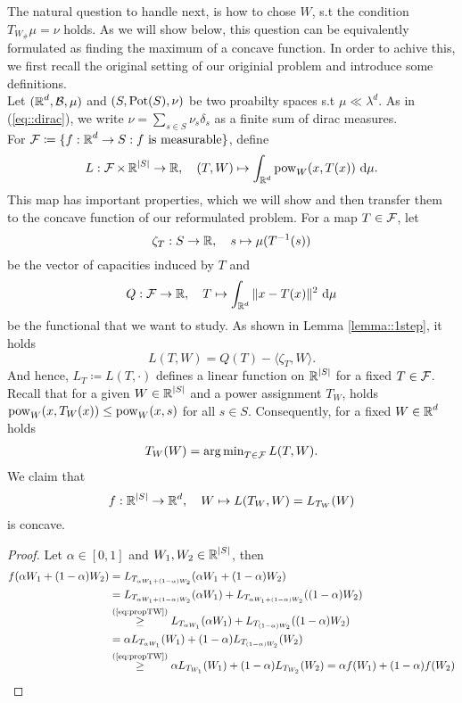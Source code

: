 \documentclass[
     12pt,         %
     a4paper,      %
     BCOR=10mm,     %
     DIV=14,        %
     ]{scrreprt}
\begin{document}
    The natural question to handle next, is how to chose $W$, s.t the condition $T_{W_{\#}}\mu = \nu$ holds. As we will show below, this question can be equivalently formulated
    as finding the maximum of a concave function. In order to achive this, we first recall the original setting of our originial problem and introduce some definitions. \\[8pt]
    \indent Let $(\operatorname{\mathbb{R}}^d, \operatorname{\mathcal{B}}, \mu)$ and $(S, \operatorname{Pot}(S), \nu)$ be two proabilty spaces s.t $\mu \ll \lambda^d$. As in (\ref{eq::dirac}), we write  $\nu = \sum_{s\in S} {\nu_s \delta_{s}} $ as 
    a finite sum of dirac measures. \\
    For $\operatorname{\mathcal{F}} \coloneqq \{ f: \operatorname{\mathbb{R}}^d \to S : f \text{ is measurable}\}$, define
    \[L: \operatorname{\mathcal{F}} \times \operatorname{\mathbb{R}}^{|S|} \to \operatorname{\mathbb{R}}, \quad (T,W) \mapsto \int_{\operatorname{\mathbb{R}}^d} \operatorname{pow}_W(x,T(x)) \ {\operatorname{{\mathrm{d}}}} \mu. \]
    This map has important properties, which we will show and then transfer them to the concave function of our reformulated problem. For a map $T\in \operatorname{\mathcal{F}}$, let 
    \[\zeta_T : S \to \operatorname{\mathbb{R}}, \quad s\mapsto \mu(T^{-1}(s)) \]
    be the vector of capacities induced by $T$ and 
    \[Q: \operatorname{\mathcal{F}} \to \operatorname{\mathbb{R}}, \quad T \mapsto \int_{\operatorname{\mathbb{R}}^d} \|x-T(x)\|^2 \ {\operatorname{{\mathrm{d}}}} \mu \]
    be the functional that we want to study. As shown in Lemma \ref{lemma::1step}, it holds
    \[L(T,W) = Q(T) - \langle \zeta_T, W \rangle. \]
    And hence, $L_T \coloneqq L(T, \cdot)$ defines a linear function on $\operatorname{\mathbb{R}}^{|S|}$ for a fixed $T \in \operatorname{\mathcal{F}}$. \\
    Recall that for a given $W \in \operatorname{\mathbb{R}}^{|S|}$ and a power assignment $T_W$, holds \\ 
    $\operatorname{pow}_W(x,T_W(x)) \le \operatorname{pow}_W(x,s)$ for all $s \in S$. Consequently, for a fixed $W \in \operatorname{\mathbb{R}}^d$ holds 
    \begin{align} \label{eq:propTW}
        T_W(W) = \operatorname{arg\,min}_{T\in \operatorname{\mathcal{F}}} L(T,W).
    \end{align}
    We claim that \[ f : \operatorname{\mathbb{R}}^{|S|} \to \operatorname{\mathbb{R}}^d, \quad W \mapsto L(T_W, W) = L_{T_W}(W) \]
    is concave.
    \begin{proof}[Proof]
        Let $\alpha \in [0,1]$ and $W_1, W_2 \in \operatorname{\mathbb{R}}^{|S|}$, then
        \begin{align*}
            f(\alpha W_1 + (1- \alpha)W_2) &= L_{T_{\alpha W_1 + (1- \alpha)W_2}}(\alpha W_1 + (1- \alpha)W_2) \\
                                        &= L_{T_{\alpha W_1 + (1- \alpha)W_2}}(\alpha W_1) + L_{T_{\alpha W_1 + (1- \alpha)W_2}}((1-\alpha) W_2)\\
                                        &\overset {\text{(\ref{eq:propTW})}}\ge L_{T_{\alpha W_1}}(\alpha W_1) + L_{T_{(1-\alpha) W_2}}((1- \alpha) W_2) \\
                                        &= \alpha L_{T_{\alpha W_1}}(W_1) + (1-\alpha) L_{T_{(1-\alpha) W_2}}(W_2) \\ 
                                        &\overset {\text{(\ref{eq:propTW})}}\ge \alpha L_{T_{W_1}}(W_1) + (1-\alpha) L_{T_{W_2}}(W_2) = \alpha f(W_1) + (1-\alpha) f(W_2)
        \end{align*}
    \end{proof}
\end{document}
